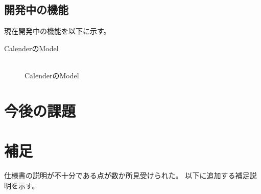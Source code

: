 ﻿\documentclass[a4j]{jarticle}
\begin{document}
\subsection{開発中の機能}
現在開発中の機能を以下に示す。
\begin{description}
	\item[CalenderのModel] \mbox{} \\
		CalenderのModel
\end{description}


\section{今後の課題}



\section{補足}
仕様書の説明が不十分である点が数か所見受けられた。
以下に追加する補足説明を示す。
\end{document}
